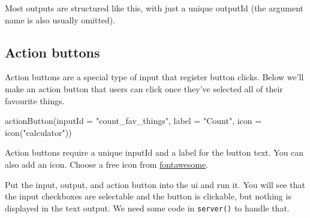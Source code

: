 \documentclass[
  oneside]{book}
\newenvironment{Shaded}{\begin{snugshade}}{\end{snugshade}}
\newcommand{\AttributeTok}[1]{\textcolor[rgb]{0.77,0.63,0.00}{#1}}
\newcommand{\FunctionTok}[1]{\textcolor[rgb]{0.00,0.00,0.00}{#1}}
\newcommand{\NormalTok}[1]{#1}
\newcommand{\StringTok}[1]{\textcolor[rgb]{0.31,0.60,0.02}{#1}}
\begin{document}
Most outputs are structured like this, with just a unique \AttributeTok{outputId} (the argument name is also usually omitted).

\hypertarget{action-buttons}{%
\subsection{Action buttons}\label{action-buttons}}

Action buttons are a special type of input that register button clicks. Below we'll make an action button that users can click once they've selected all of their favourite things.

\begin{Shaded}
\begin{Highlighting}[]
\FunctionTok{actionButton}\NormalTok{(}\AttributeTok{inputId =} \StringTok{"count\_fav\_things"}\NormalTok{,}
             \AttributeTok{label =} \StringTok{"Count"}\NormalTok{,}
             \AttributeTok{icon =} \FunctionTok{icon}\NormalTok{(}\StringTok{"calculator"}\NormalTok{))}
\end{Highlighting}
\end{Shaded}

Action buttons require a unique \AttributeTok{inputId} and a \AttributeTok{label} for the button text. You can also add an \AttributeTok{icon}. Choose a free icon from \href{https://fontawesome.com/icons?d=gallery\&m=free}{fontawesome}.

Put the input, output, and action button into the ui and run it. You will see that the input checkboxes are selectable and the button is clickable, but nothing is displayed in the text output. We need some code in \texttt{server}\texttt{()} to handle that.
\end{document}
